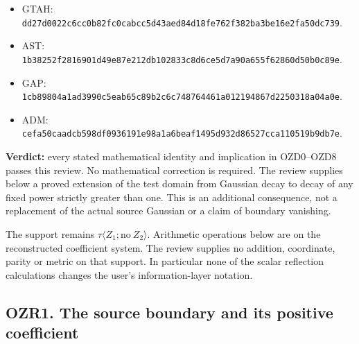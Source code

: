 \begin{itemize}
\tightlist
\item
  GTAH:
  \texttt{dd27d0022c6cc0b82fc0cabcc5d43aed84d18fe762f382ba3be16e2fa50dc739}.
\item
  AST:
  \texttt{1b38252f2816901d49e87e212db102833c8d6ce5d7a90a655f62860d50b0c89e}.
\item
  GAP:
  \texttt{1cb89804a1ad3990c5eab65c89b2c6c748764461a012194867d2250318a04a0e}.
\item
  ADM:
  \texttt{cefa50caadcb598df0936191e98a1a6beaf1495d932d86527cca110519b9db7e}.
\end{itemize}

\textbf{Verdict:} every stated mathematical identity and implication in
OZD0--OZD8 passes this review. No mathematical correction is required.
The review supplies below a proved extension of the test domain from
Gaussian decay to decay of any fixed power strictly greater than one.
This is an additional consequence, not a replacement of the actual
source Gaussian or a claim of boundary vanishing.

The support remains \(\tau\langle Z_1;\mathrm{no}\ Z_2\rangle\).
Arithmetic operations below are on the reconstructed coefficient system.
The review supplies no addition, coordinate, parity or metric on that
support. In particular none of the scalar reflection calculations
changes the user's information-layer notation.

\subsection{OZR1. The source boundary and its positive
coefficient}\label{ozr1.-the-source-boundary-and-its-positive-coefficient}


